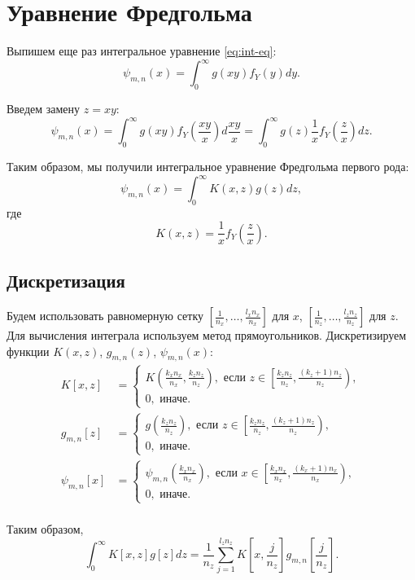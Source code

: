 \documentclass[../paper.tex]{subfiles}
\begin{document}
\section{Уравнение Фредгольма}
Выпишем еще раз интегральное уравнение \ref{eq:int-eq}:
\[
	\psi_{m,n}(x) = \int_{0}^{\infty} g(xy) f_Y(y) dy  
.\]

Введем замену $z = xy$:
\[
	\psi_{m,n}(x) = \int_{0}^{\infty}  g(xy) f_Y\left(\frac{xy}{x}\right) d\frac{xy}{x}
	= \int_{0}^{\infty} g(z) \frac{1}{x} f_Y\left(\frac{z}{x}\right) dz  
.\]

Таким образом, мы получили интегральное уравнение Фредгольма первого рода:
\[
	\psi_{m,n}(x) = \int_{0}^{\infty} K(x, z) g(z) dz 
,\]
где
\[
	K(x, z) = \frac{1}{x} f_Y \left(\frac{z}{x}\right)
.\]

\subsection{Дискретизация}
Будем использовать равномерную сетку $\left[\frac{1}{n_x}, \dots, \frac{l_x n_x}{n_x}\right]$ для $x$, $\left[\frac{1}{n_z}, \dots, \frac{l_z n_z}{n_z}\right]$ для $z$.
Для вычисления интеграла используем метод прямоугольников.
Дискретизируем функции $K(x,z)$, $g_{m,n}(z)$, $\psi_{m,n}(x)$:
\begin{align*}
	K[x,z] 
	&=
	\begin{cases}
		K\left(\frac{k_x n_x}{n_x}, \frac{k_z n_z}{n_z} \right), \text{ если } 
			z \in \left[\frac{k_z n_z}{n_z}, \frac{(k_z+1)n_z}{n_z}\right),\\
		0, \text{ иначе.}
	\end{cases}\\
	g_{m,n}[z]
	&=
	\begin{cases}
		g\left(\frac{k_z n_z}{n_z}\right), \text{ если } z \in \left[\frac{k_z n_z}{n_z}, \frac{(k_z+1)n_z}{n_z}\right),\\
		0, \text{ иначе.}
	\end{cases}\\
	\psi_{m,n}[x]
	&=
	\begin{cases}
		\psi_{m,n}\left(\frac{k_x n_x}{n_x}\right), \text{ если } x \in \left[\frac{k_x n_x}{n_x}, \frac{(k_x+1)n_x}{n_x}\right),\\
		0, \text{ иначе.}
	\end{cases}\\
\end{align*}

Таким образом,
\[
	\int_{0}^{\infty} K[x,z] g[z] dz
	= \frac{1}{n_z} \sum_{j=1}^{l_z n_z} K\left[x, \frac{j}{n_z}\right] g_{m,n}\left[\frac{j}{n_z}\right] 
.\]
\end{document}
